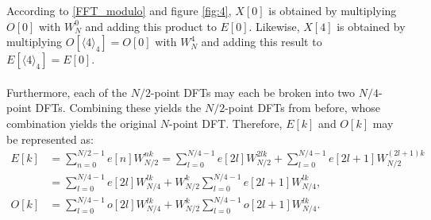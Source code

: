 According to \eqref{FFT_modulo} and figure \ref{fig:4}, $X[0]$ is obtained by multiplying $O[0]$ with $W_N^0$ and adding this product to $E[0]$. Likewise, $X[4]$ is obtained by multiplying $O[\langle 4\rangle_4] = O[0]$ with $W_N^4$ and adding this result to $E[\langle 4\rangle_4] = E[0]$.
\\ \\
Furthermore, each of the $N/2$-point DFTs may each be broken into two $N/4$-point DFTs. Combining these yields the $N/2$-point DFTs from before, whose combination yields the original $N$-point DFT. Therefore, $E[k]$ and $O[k]$ may be represented as:
\begin{align*}
E[k] &= \sum_{n=0}^{N/2-1} e[n] W_{N/2}^{nk} = \sum_{l=0}^{N/4-1} e[2l] W_{N/2}^{2lk} + \sum_{l=0}^{N/4-1} e[2l+1] W_{N/2}^{(2l+1)k} \\
&= \sum_{l=0}^{N/4-1} e[2l] W_{N/4}^{lk} + W_{N/2}^k \sum_{l=0}^{N/4-1} e[2l+1] W_{N/4}^{lk}, \\
O[k] &= \sum_{l=0}^{N/4-1} o[2l] W_{N/4}^{lk} + W_{N/2}^k \sum_{l=0}^{N/4-1} o[2l+1] W_{N/4}^{lk}.
\end{align*}

